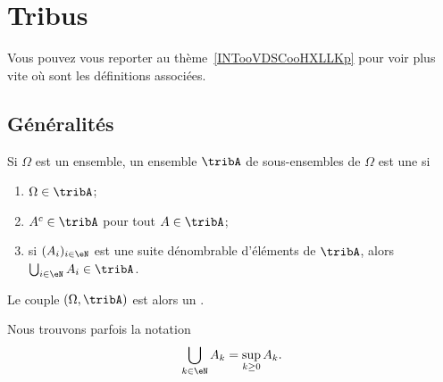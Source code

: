 
\section{Tribus}

Vous pouvez vous reporter au thème~\ref{INTooVDSCooHXLLKp} pour voir plus vite où sont les définitions associées.

\subsection{Généralités}

\begin{definition}  \label{DefjRsGSy}
	Si \( \Omega\) est un ensemble, un ensemble \( \tribA\) de sous-ensembles de \( \Omega\) est une  si
	\begin{enumerate}
		\item
		      \( \Omega\in\tribA\);
		\item
		      \( A^c\in \tribA\) pour tout \( A\in\tribA\);
		\item       \label{ItemooPEQNooYiYNtN}
		      si \( (A_i)_{i\in \eN}\) est une suite dénombrable d'éléments de \( \tribA\), alors \( \bigcup_{i\in \eN}A_i\in\tribA\).
	\end{enumerate}
	Le couple \( (\Omega,\tribA)\) est alors un .
\end{definition}

\begin{remark}
	Nous trouvons parfois la notation
	\begin{equation}
		\bigcup_{k\in \eN}A_k=\sup_{k\geq 0}A_k.
	\end{equation}
\end{remark}


